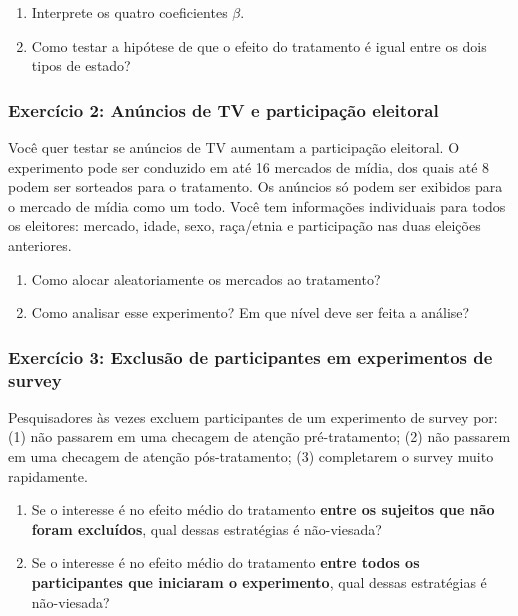 \documentclass[
]{article}
\begin{document}
\begin{enumerate}
\def\labelenumi{(\alph{enumi})}
\item
  Interprete os quatro coeficientes \(\beta\).
\item
  Como testar a hipótese de que o efeito do tratamento é igual entre os dois tipos de estado?
\end{enumerate}

\subsubsection{Exercício 2: Anúncios de TV e participação eleitoral}\label{exercuxedcio-2-anuxfancios-de-tv-e-participauxe7uxe3o-eleitoral}

Você quer testar se anúncios de TV aumentam a participação eleitoral. O experimento pode ser conduzido em até 16 mercados de mídia, dos quais até 8 podem ser sorteados para o tratamento. Os anúncios só podem ser exibidos para o mercado de mídia como um todo. Você tem informações individuais para todos os eleitores: mercado, idade, sexo, raça/etnia e participação nas duas eleições anteriores.

\begin{enumerate}
\def\labelenumi{(\alph{enumi})}
\item
  Como alocar aleatoriamente os mercados ao tratamento?
\item
  Como analisar esse experimento? Em que nível deve ser feita a análise?
\end{enumerate}

\subsubsection{Exercício 3: Exclusão de participantes em experimentos de survey}\label{exercuxedcio-3-exclusuxe3o-de-participantes-em-experimentos-de-survey}

Pesquisadores às vezes excluem participantes de um experimento de survey por: (1) não passarem em uma checagem de atenção pré-tratamento; (2) não passarem em uma checagem de atenção pós-tratamento; (3) completarem o survey muito rapidamente.

\begin{enumerate}
\def\labelenumi{(\alph{enumi})}
\item
  Se o interesse é no efeito médio do tratamento \textbf{entre os sujeitos que não foram excluídos}, qual dessas estratégias é não-viesada?
\item
  Se o interesse é no efeito médio do tratamento \textbf{entre todos os participantes que iniciaram o experimento}, qual dessas estratégias é não-viesada?
\end{enumerate}
\end{document}

